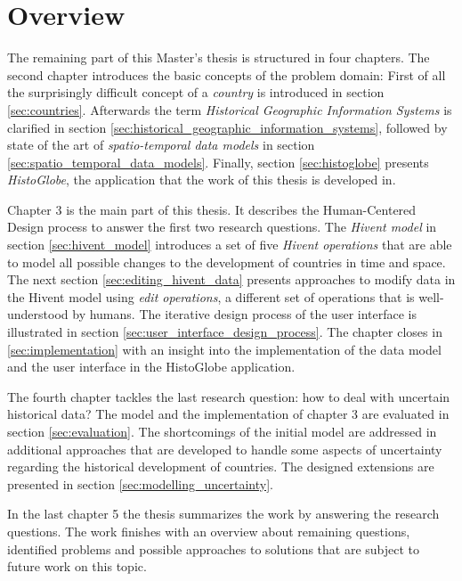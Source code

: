 \section{Overview} %
\label{sec:overview}

The remaining part of this Master's thesis is structured in four chapters. The second chapter introduces the basic concepts of the problem domain: First of all the surprisingly difficult concept of a \emph{country} is introduced in section \ref{sec:countries}. Afterwards the term \emph{Historical Geographic Information Systems} is clarified in section \ref{sec:historical_geographic_information_systems}, followed by state of the art of \emph{spatio-temporal data models}  in section \ref{sec:spatio_temporal_data_models}. Finally, section \ref{sec:histoglobe} presents \emph{HistoGlobe}, the application that the work of this thesis is developed in.

Chapter 3 is the main part of this thesis. It describes the Human-Centered Design process to answer the first two research questions. The \emph{Hivent model} in section \ref{sec:hivent_model} introduces a set of five \emph{Hivent operations} that are able to model all possible changes to the development of countries in time and space. The next section \ref{sec:editing_hivent_data} presents approaches to modify data in the Hivent model using \emph{edit operations}, a different set of operations that is well-understood by humans. The iterative design process of the user interface is illustrated in section \ref{sec:user_interface_design_process}. The chapter closes in \ref{sec:implementation} with an insight into the implementation of the data model and the user interface in the HistoGlobe application.

The fourth chapter tackles the last research question: how to deal with uncertain historical data? The model and the implementation of chapter 3 are evaluated in section \ref{sec:evaluation}. The shortcomings of the initial model are addressed in additional approaches that are developed to handle some aspects of uncertainty regarding the historical development of countries. The designed extensions are presented in section \ref{sec:modelling_uncertainty}.

In the last chapter 5 the thesis summarizes the work by answering the research questions. The work finishes with an overview about remaining questions, identified problems and possible approaches to solutions that are subject to future work on this topic.



